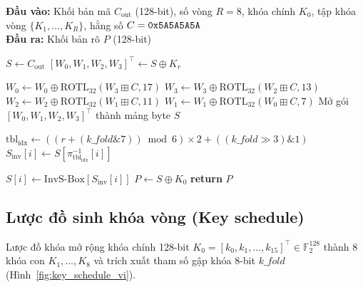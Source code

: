 \documentclass[10pt,twocolumn]{article}
\begin{document}
\begin{algorithm}[htbp]
\caption{Quy trình giải mã Rubik-4D.}
\label{alg:rubik4d_dec_vi}
\textbf{Đầu vào:} Khối bản mã $C_{\text{out}}$ (128-bit), số vòng $R=8$, khóa chính $K_0$, tập khóa vòng $\{K_1, \dots, K_R\}$, hằng số $C = \text{\texttt{0x5A5A5A5A}}$ \\
\textbf{Đầu ra:} Khối bản rõ $P$ (128-bit)
\begin{algorithmic}[1]
\STATE {}
\STATE $S \leftarrow C_{\text{out}}$
    \STATE {}
    \STATE $[W_0, W_1, W_2, W_3]^\top \leftarrow S \oplus K_r$
    
    \STATE {}
    \STATE $W_0 \leftarrow W_0 \oplus \text{ROTL}_{32}(W_3 \boxplus C, 17)$
    \STATE $W_3 \leftarrow W_3 \oplus \text{ROTL}_{32}(W_2 \boxplus C, 13)$
    \STATE $W_2 \leftarrow W_2 \oplus \text{ROTL}_{32}(W_1 \boxplus C, 11)$
    \STATE $W_1 \leftarrow W_1 \oplus \text{ROTL}_{32}(W_0 \boxplus C, 7)$
    \STATE Mở gói $[W_0, W_1, W_2, W_3]^\top$ thành mảng byte $S$
    
    \STATE {}
    \STATE $\text{tbl}_{\text{idx}} \leftarrow \left( (r + (\mathit{k\_fold} \mathbin{\&} 7)) \bmod 6 \right) \times 2 + ((\mathit{k\_fold} \gg 3) \mathbin{\&} 1)$
        \STATE $S_{\text{inv}}[i] \leftarrow S[\pi_{\text{tbl}_{\text{idx}}}^{-1}[i]]$
    \ENDFOR
    
    \STATE {}
        \STATE $S[i] \leftarrow \text{InvS-Box}[S_{\text{inv}}[i]]$
    \ENDFOR
\ENDFOR
\STATE {}
\STATE $P \leftarrow S \oplus K_0$
\STATE \textbf{return} $P$
\end{algorithmic}
\end{algorithm}

\subsection{Lược đồ sinh khóa vòng (Key schedule)}
Lược đồ khóa mở rộng khóa chính 128-bit $K_0 = [k_0, k_1, \dots, k_{15}]^\top \in \mathbb{F}_2^{128}$ thành 8 khóa con $K_1, \dots, K_8$ và trích xuất tham số gập khóa 8-bit $\mathit{k\_fold}$ (Hình~\ref{fig:key_schedule_vi}).
\end{document}
